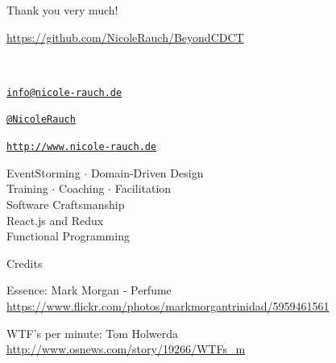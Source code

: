 \begin{frame}{Thank you very much!}

        \begin{center}
                \url{https://github.com/NicoleRauch/BeyondCDCT}
        \end{center}

  ~\\[1em]
  \begin{block}{}
    \begin{description}[Twitterxx]
    \item[E-Mail]  \href{mailto:info@nicole-rauch.de}{\texttt{info@nicole-rauch.de}}
    \item[Twitter] \href{http://twitter.com/NicoleRauch}{\texttt{@NicoleRauch}}
    \item[Web] \href{http://www.nicole-rauch.de}{\texttt{http://www.nicole-rauch.de}}
    \end{description}
  \end{block}

\begin{center}
EventStorming $\cdot$ Domain-Driven Design \\
Training $\cdot$ Coaching $\cdot$ Facilitation \\
Software Craftsmanship \\ 
React.js and Redux  \\
Functional Programming
\end{center}  

%

\end{frame}


\begin{frame}{Credits}

Essence: Mark Morgan - Perfume
{\footnotesize \url{https://www.flickr.com/photos/markmorgantrinidad/5959461561}}

WTF's per minute: Tom Holwerda
{\footnotesize \url{http://www.osnews.com/story/19266/WTFs_m}}

\end{frame}

